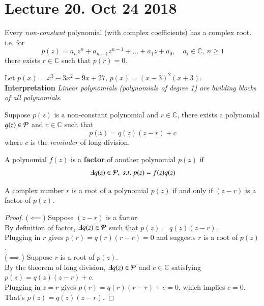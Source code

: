 \documentclass[10pt]{article}
\begin{document}
	\section{Lecture 20. Oct 24 2018}
	\begin{theorem}
		Every \emph{non-constant} polynomial (with complex coefficients) has a complex root.
		i.e. for 
		\[
			p(z) = a_n z^n + a_{n-1} z^{n-1} + \dots + a_1 z + a_0,\quad a_i \in \mathbb{C},\ n\geq 1
		\]
		there exists $r \in \mathbb{C}$ such that $p(r) = 0$.
	\end{theorem}
	\begin{example}
		Let $p(x) = x^3 -3x^2 - 9x + 27$, $p(x) = (x-3)^2 (x+3)$. \\
		\textbf{Interpretation} \emph{Linear polynomials (polynomials of degree 1) are building blocks of all polynomials.}
	\end{example}
	
	\begin{theorem}
		Suppose $p(z)$ is a non-constant polynomial and $r \in \mathbb{C}$, there exists a polynomial $q(z) \in \mathcal{{P}}$ and $c \in \mathbb{C}$ such that
		\[
			p(z) = q(z)(z-r) + c
		\]
		where $c$ is the \emph{reminder} of long division.
	\end{theorem}
	
	\begin{definition}
		A polynomial $f(z)$ is a \textbf{factor} of another polynomial $p(z)$ if 
		\[
			\exists q(z) \in \mathcal{{P}},\ s.t.\ p(z) = f(z)q(z)
		\]
	\end{definition}
	
	\begin{theorem}
		A complex number $r$ is a root of a polynomial $p(z)$ if and only if $(z-r)$ is a factor of $p(z)$.
	\end{theorem}
	\begin{proof}
		($\impliedby$) Suppose $(z-r)$ is a factor. \\
		By definition of factor, $\exists q(z) \in \mathcal{{P}}$ such that $p(z) = q(z)(z-r)$. \\
		Plugging in $r$ gives $p(r) = q(r)(r-r) = 0$ and suggests $r$ is a root of $p(z)$. \\
		($\implies$) Suppose $r$ is a root of $p(z)$. \\
		By the theorem of long division, $\exists q(z) \in \mathcal{{P}}$ and $c \in \mathbb{C}$ satisfying \\
		$p(z) = q(z)(z-r) + c$. \\
		Plugging in $z=r$ gives $p(r) = q(r)(r-r) + c = 0$, which implies $c=0$. \\
		That's $p(z) = q(z)(z-r)$.
	\end{proof}
	
\end{document}
